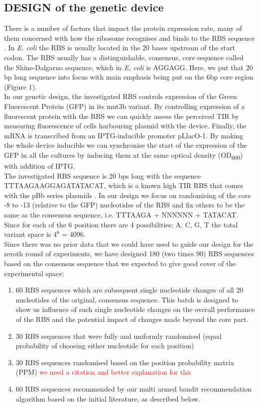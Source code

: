 \documentclass{article}
\begin{document}
\subsection{DESIGN of the genetic device}
There is a number of factors that impact the protein expression rate, many of them concerned with how the ribosome recognises and binds to the RBS sequence \cite{Chen1994,Vellanoweth1992}. In \emph{E. coli} the RBS is usually located in the 20 bases upstream of the start codon. The RBS usually has a distinguishable, consensus, core sequence called the Shine-Dalgarno sequence, which in \emph{E. coli} is AGGAGG. Here, we put that 20 bp long sequence into focus with main emphasis being put on the 6bp core region (Figure 1).\\
In our genetic design, the investigated RBS controls expression of the Green Fluorescent Protein (GFP) in its mut3b variant. By controlling expression of a fluorescent protein with the RBS we can quickly assess the perceived TIR by measuring fluorescence of cells harbouring plasmid with the device. Finally, the mRNA is transcribed from an IPTG-inducible promoter pLlacO-1. By making the whole device inducible we can synchronise the start of the expression of the GFP in all the cultures by inducing them at the same optical density (OD\textsubscript{600}) with addition of IPTG.\\
The investigated RBS sequence is 20 bps long with the sequence TTTAAGAAGGAGATATACAT, which is a known high TIR RBS that comes with the pBb series plasmids \cite{Lee2011}. In our design we focus on randomising of the core -8 to -13 (relative to the GFP) nucleotides of the RBS and fix others to be the same as the consensus sequence, i.e. TTTAAGA + NNNNNN + TATACAT. Since for each of the 6 position there are 4 possibilities: A, C, G, T the total variant space is $4^6$ = 4096.\\
Since there was no prior data that we could have used to guide our design for the zeroth round of experiments, we have designed 180 (two times 90) RBS sequences based on the consensus sequence that we expected to give good cover of the experimental space: 

\begin{enumerate}
    \item 60 RBS sequences which are subsequent single nucleotide changes of all 20 nucleotides of the original, consensus sequence. This batch is designed to show us influence of such single nucleotide changes on the overall performance of the RBS and the potential impact of changes made beyond the core part.
    \item 30 RBS sequences that were fully and uniformly randomised (equal probability of choosing either nucleotide for each position) 
    \item 30 RBS sequences randomised based on the position probability matrix (PPM) \textcolor{red}{we need a citation and better explanation for this}  
    \item 60 RBS sequences recommended by our multi armed bandit recommendation algorithm based on the initial literature, as described below.
\end{enumerate}{}
\end{document}
